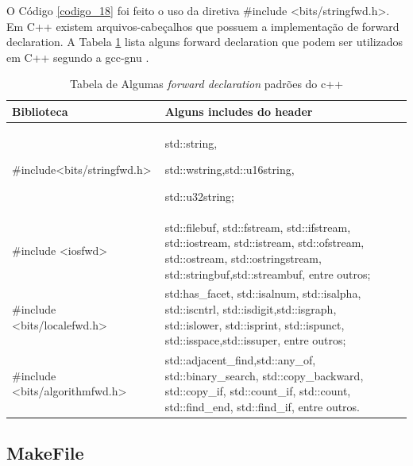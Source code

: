 O Código \ref{codigo_18} foi feito o uso da diretiva \#include
 <bits/stringfwd.h>. Em C++  existem arquivos-cabeçalhos que possuem a
 implementação de forward declaration. A Tabela \ref{tab:tabela_04} lista 
 alguns forward declaration que podem ser utilizados em C++ segundo
 a gcc-gnu \cite{gcc-api}.

\begin{table}[h]
    \label{tab:tabela_04}
    \caption {Tabela de Algumas \textit{forward 
              declaration} padrões do c++}
    \centering
    \begin{tabular}{ |l|p{10cm} | l|p{10cm} |}
    \hline
    Biblioteca & Alguns includes do header\\
    \hline

    \#include<bits/stringfwd.h> & std::string,
 
                                 std::wstring,std::u16string, 

                                 std::u32string;\\
    \hline
    \#include <iosfwd> & std::filebuf, std::fstream,
                        std::ifstream, std::iostream,
                        std::istream, std::ofstream,
                        std::ostream, std::ostringstream,
                        std::stringbuf,std::streambuf,
                        entre outros;\\
    \hline
    \#include <bits/localefwd.h> & std:has\_facet, std::isalnum,
                                  std::isalpha, std::iscntrl,
                                  std::isdigit,std::isgraph,
                                  std::islower, std::isprint,
                                  std::ispunct,
                                  std::isspace,std::issuper,
                                  entre outros;\\
    \hline
    \#include <bits/algorithmfwd.h> & std::adjacent\_find,std::any\_of,
                                     std::binary\_search, 
                                     std::copy\_backward, std::copy\_if,
                                     std::count\_if, std::count,
                                     std::find\_end, std::find\_if,
                                     entre outros.\\
    \hline
  \end{tabular}
\end{table}


\subsection{MakeFile}


